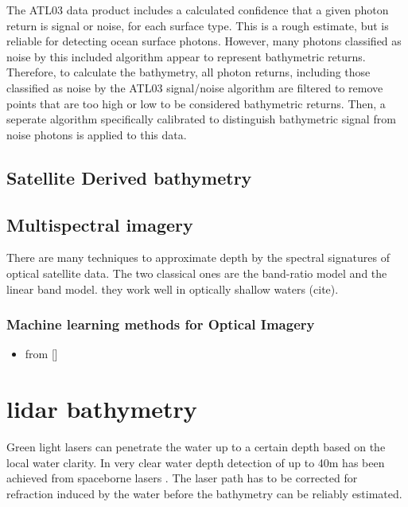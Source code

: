 The ATL03 data product includes a calculated confidence that a given
photon return is signal or noise, for each surface type. This is a rough
estimate, but is reliable for detecting ocean surface photons. However,
many photons classified as noise by this included algorithm appear to
represent bathymetric returns. Therefore, to calculate the bathymetry,
all photon returns, including those classified as noise by the ATL03
signal/noise algorithm are filtered to remove points that are too high
or low to be considered bathymetric returns. Then, a seperate algorithm
specifically calibrated to distinguish bathymetric signal from noise
photons is applied to this data.

\hypertarget{satellite-derived-bathymetry}{%
  \subsection{Satellite Derived
    bathymetry}\label{satellite-derived-bathymetry}}

\hypertarget{multispectral-imagery}{%
  \subsection{Multispectral imagery}\label{multispectral-imagery}}

There are many techniques to approximate depth by the spectral
signatures of optical satellite data. The two classical ones are the
band-ratio model and the linear band model. they work well in optically
shallow waters (cite).

\hypertarget{machine-learning-methods-for-optical-imagery}{%
  \subsubsection{Machine learning methods for Optical
    Imagery}\label{machine-learning-methods-for-optical-imagery}}

\begin{itemize}

  \item
        from {[}{]}
\end{itemize}

\hypertarget{lidar-bathymetry}{%
  \section{lidar bathymetry}\label{lidar-bathymetry}}

Green light lasers can penetrate the water up to a certain depth based
on the local water clarity. In very clear water depth detection of up to
40m has been achieved from spaceborne lasers \cite{Parrish2019}. The
laser path has to be corrected for refraction induced by the water
before the bathymetry can be reliably estimated.

